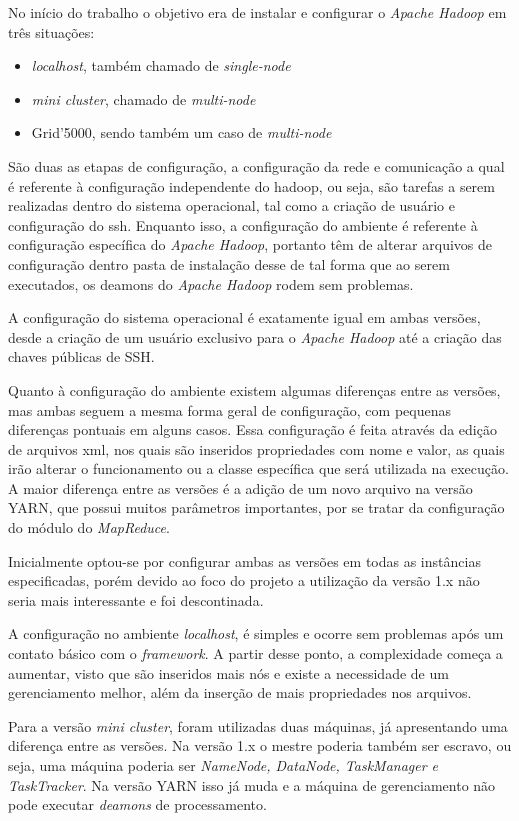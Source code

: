 No início do trabalho o objetivo era de instalar e configurar o \emph{Apache Hadoop} em três situações: 
\begin{itemize}
	\item \emph{localhost}, também chamado de \emph{single-node}
	\item \emph{mini cluster}, chamado de \emph{multi-node}
	\item Grid'5000, sendo também um caso de \emph{multi-node}
\end{itemize}

São duas as etapas de configuração, a configuração da rede e comunicação a qual é referente à configuração independente do hadoop, ou seja, são tarefas a serem realizadas dentro do sistema operacional, tal como a criação de usuário e configuração do ssh. Enquanto isso, a configuração do ambiente é referente à configuração específica do \emph{Apache Hadoop}, portanto têm de alterar arquivos de configuração dentro pasta de instalação desse de tal forma que ao serem executados, os deamons do \emph{Apache Hadoop} rodem sem problemas.

A configuração do sistema operacional é exatamente igual em ambas versões, desde a criação de um usuário exclusivo para o \emph{Apache Hadoop} até a criação das chaves públicas de SSH.

Quanto à configuração do ambiente existem algumas diferenças entre as versões, mas ambas seguem a mesma forma geral de configuração, com pequenas diferenças pontuais em alguns casos. Essa configuração é feita através da edição de arquivos xml, nos quais são inseridos propriedades com nome e valor, as quais irão alterar o funcionamento ou a classe específica que será utilizada na execução. A maior diferença entre as versões é a adição de um novo arquivo na versão YARN, que possui muitos parâmetros importantes, por se tratar da configuração do módulo do \emph{MapReduce}.

Inicialmente optou-se por configurar ambas as versões em todas as instâncias especificadas, porém devido ao foco do projeto a utilização da versão 1.x não seria mais interessante e foi descontinada.

A configuração no ambiente \emph{localhost}, é simples e ocorre sem problemas após um contato básico com o \emph{framework}. A partir desse ponto, a complexidade começa a aumentar, visto que são inseridos mais nós e existe a necessidade de um gerenciamento melhor, além da inserção de mais propriedades nos arquivos.

Para a versão \emph{mini cluster}, foram utilizadas duas máquinas, já apresentando uma diferença entre as versões. Na versão 1.x o mestre poderia também ser escravo, ou seja, uma máquina poderia ser \emph{NameNode, DataNode, TaskManager e TaskTracker}. Na versão YARN isso já muda e a máquina de gerenciamento não pode executar \emph{deamons} de processamento.

